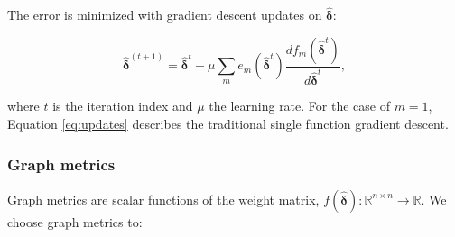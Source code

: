 \documentclass[12pt,a4paper,english]{article}
\begin{document}
The error is minimized with gradient descent updates on $\bm{\hat{\delta}}$: 

\begin{equation}
\bm{\hat{\delta}}^{(t+1)} = \bm{\hat{\delta}}^t-\mu\sum_m e_m(\bm{\hat{\delta}}^t)\frac{df_m(\bm{\hat{\delta}}^t)}{d\bm{\hat{\delta}}^t},
\label{eq:updates}
\end{equation}

where $t$ is the iteration index and $\mu$ the learning rate. For the case of $m=1$, Equation \ref{eq:updates} describes the traditional single function gradient descent. 

\subsubsection{Graph metrics}
Graph metrics are scalar functions of the weight matrix, $f(\bm{\hat{\delta}}): \mathbb{R}^{n \times n}\rightarrow \mathbb{R}$. We choose graph metrics to:
\end{document}
